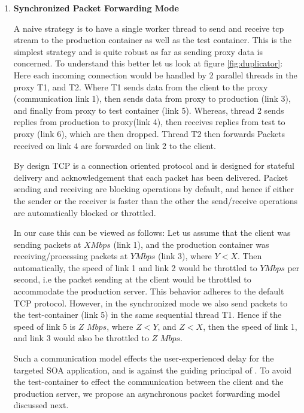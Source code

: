 \begin{enumerate}[leftmargin=*]

\item \textbf{Synchronized Packet Forwarding Mode}

A naive strategy is to have a single worker thread to send and receive tcp stream to the production container as well as the test container.
This is the simplest strategy and is quite robust as far as sending proxy data is concerned. 
To understand this better let us look at figure \ref{fig:duplicator}: Here each incoming connection would be handled by 2 parallel threads in the proxy T1, and T2. 
Where T1 sends data from the client to the proxy (communication link 1), then sends data from proxy to production (link 3), and finally from proxy to test container (link 5). 
Whereas, thread 2 sends replies from production to proxy(link 4), then receives replies from test to proxy (link 6), which are then dropped. 
Thread T2 then forwards Packets received on link 4 are forwarded on link 2 to the client.

By design TCP is a connection oriented protocol and is designed for stateful delivery and acknowledgement that each packet has been delivered.
Packet sending and receiving are blocking operations by default, and hence if either the sender or the receiver is faster than the other the send/receive operations are automatically blocked or throttled.

In our case this can be viewed as follows: Let us assume that the client was sending packets at $X Mbps$ (link 1), and the production container was receiving/processing packets at $Y Mbps$ (link 3), where $Y<X$. 
Then automatically, the speed of link 1 and link 2 would be throttled to $Y Mbps$ per second, i.e the packet sending at the client would be throttled to accommodate the production server.
This behavior adheres to the default TCP protocol.
However, in the synchronized mode we also send packets to the test-container (link 5) in the same sequential thread T1. 
Hence if the speed of link 5 is $Z$ $Mbps$, where $Z < Y$, and $Z < X$, then the speed of link 1, and link 3 would also be throttled to $Z$ $Mbps$.

Such a communication model effects the user-experienced delay for the targeted SOA application, and is against the guiding principal of \parikshan.
To avoid the test-container to effect the communication between the client and the production server, we propose an asynchronous packet forwarding model discussed next.


\end{enumerate}
